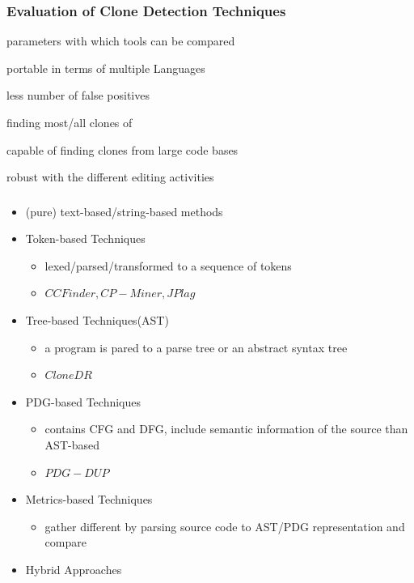 \documentclass[pdf]{beamer}
\begin{document}
\begin{frame}
\frametitle{Evaluation of Clone Detection Techniques}
\begin{block}{parameters with which tools can be compared}
\begin{description}
\vskip8pt
\item [Portability:] portable in terms of multiple Languages
\item [Precision:]less number of false positives
\item [Soundness:]finding most\slash all clones of 
\item [Scalability:]capable of finding clones from large code bases
\item [robustness:]robust with the different editing activities
\vskip8pt
\item[\ldots]
\end{description}

\end{block}
\end{frame}
\begin{frame}
\frametitle{\secname}
\begin{itemize}
  \item (pure) text-based\slash string-based methods
  \item Token-based Techniques
  \begin{itemize}
    \item lexed/parsed/transformed to a sequence of tokens
    \item $CCFinder,CP-Miner,JPlag$
  \end{itemize}
  \item Tree-based Techniques(AST)
  \begin{itemize}
    \item a program is pared to a parse tree or an abstract syntax tree
    \item $CloneDR$
  \end{itemize}
  \item PDG-based Techniques
  \begin{itemize}
    \item contains CFG and DFG, include semantic information of the source than
    AST-based
    \item $PDG-DUP$
  \end{itemize}
  \item Metrics-based Techniques
  \begin{itemize}
    \item gather different  by parsing source code to AST/PDG
    representation and compare 
  \end{itemize}
  \item Hybrid Approaches
\end{itemize}
\end{frame}
\end{document}

